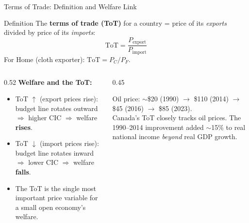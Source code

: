 \documentclass[aspectratio=169]{beamer}
\begin{document}
\begin{frame}{Terms of Trade: Definition and Welfare Link}
\begin{block}{Definition}
The \textbf{terms of trade (ToT)} for a country = price of its \emph{exports} divided by price of its \emph{imports}:
\[\text{ToT} = \frac{P_{\text{export}}}{P_{\text{import}}}\]
For Home (cloth exporter): $\text{ToT} = P_C/P_F$.
\end{block}
\vspace{0.3em}
\begin{columns}
\begin{column}{0.52\textwidth}
\textbf{Welfare and the ToT:}
\begin{itemize}
  \item ToT $\uparrow$ (export prices rise): budget line rotates outward $\Rightarrow$ higher CIC $\Rightarrow$ welfare \textbf{rises}.
  \item ToT $\downarrow$ (import prices rise): budget line rotates inward $\Rightarrow$ lower CIC $\Rightarrow$ welfare \textbf{falls}.
  \item The ToT is the single most important price variable for a small open economy's welfare.
\end{itemize}
\end{column}
\begin{column}{0.45\textwidth}
\begin{canadex}
  Oil price: $\sim$\$20 (1990) $\to$ \$110 (2014) $\to$ \$45 (2016) $\to$ \$85 (2023).\\[0.3em]
  Canada's ToT closely tracks oil prices. The 1990--2014 improvement added $\sim$15\% to real national income \emph{beyond} real GDP growth.
\end{canadex}
\end{column}
\end{columns}
\end{frame}
\end{document}
